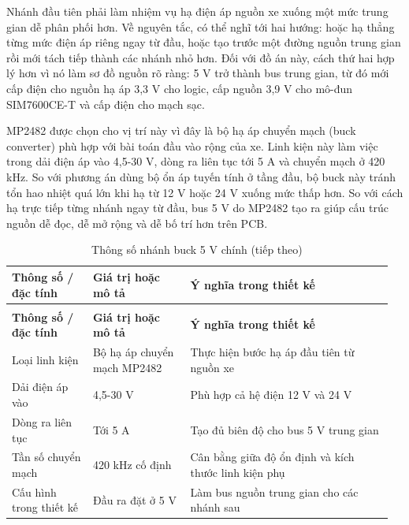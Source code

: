\documentclass[a4paper]{extarticle}
\newcommand{\thesissettableid}[2]{%
  \renewcommand{\thetable}{#1}%
  \renewcommand{\theHtable}{#2}%
}
\begin{document}
Nhánh đầu tiên phải làm nhiệm vụ hạ điện áp nguồn xe xuống một mức trung
gian dễ phân phối hơn. Về nguyên tắc, có thể nghĩ tới hai hướng: hoặc hạ
thẳng từng mức điện áp riêng ngay từ đầu, hoặc tạo trước một đường nguồn
trung gian rồi mới tách tiếp thành các nhánh nhỏ hơn. Đối với đồ án này,
cách thứ hai hợp lý hơn vì nó làm sơ đồ nguồn rõ ràng: 5 V trở thành bus
trung gian, từ đó mới cấp điện cho nguồn hạ áp 3,3 V cho logic, cấp nguồn 3,9 V cho mô-đun SIM7600CE-T và cấp điện cho mạch sạc.

MP2482 được chọn cho vị trí này vì đây là bộ hạ áp chuyển mạch (buck
converter) phù hợp với bài toán đầu vào rộng của xe. Linh kiện này làm việc
trong dải điện áp vào 4,5-30 V, dòng ra liên tục tới 5 A và chuyển mạch ở
420 kHz. So với phương án dùng
bộ ổn áp tuyến tính ở tầng đầu, bộ buck này tránh tổn hao nhiệt quá lớn khi
hạ từ 12 V hoặc 24 V xuống mức thấp hơn. So với cách hạ trực tiếp từng nhánh
ngay từ đầu, bus 5 V do MP2482 tạo ra giúp cấu trúc nguồn dễ đọc, dễ mở rộng
và dễ bố trí hơn trên PCB.

{\thesissettableid{3.12A}{condensed-bang-3-12a-thong-so-nhanh-buck-5-v-chinh}
\def\LTcaptype{table}
\begin{longtable}{|L{0.207\linewidth}|L{0.245\linewidth}|L{0.506\linewidth}|}
\caption{Thông số nhánh buck 5 V chính}\label{tab:condensed-bang-3-12a-thong-so-nhanh-buck-5-v-chinh}\\
\hline
\textbf{Thông số / đặc tính} & \textbf{Giá trị hoặc mô tả} & \textbf{Ý nghĩa trong thiết kế} \\
\hline
\endfirsthead
\caption[]{Thông số nhánh buck 5 V chính (tiếp theo)}\\
\hline
\textbf{Thông số / đặc tính} & \textbf{Giá trị hoặc mô tả} & \textbf{Ý nghĩa trong thiết kế} \\
\hline
\endhead
\endfoot
\endlastfoot
Loại linh kiện & Bộ hạ áp chuyển mạch MP2482 & Thực hiện bước hạ áp đầu tiên từ nguồn xe \\\hline
Dải điện áp vào & 4,5-30 V & Phù hợp cả hệ điện 12 V và 24 V \\\hline
Dòng ra liên tục & Tới 5 A & Tạo đủ biên độ cho bus 5 V trung gian \\\hline
Tần số chuyển mạch & 420 kHz cố định & Cân bằng giữa độ ổn định và kích thước linh kiện phụ \\\hline
Cấu hình trong thiết kế & Đầu ra đặt ở 5 V & Làm bus nguồn trung gian cho các nhánh sau \\\hline
\end{longtable}
}
\end{document}

